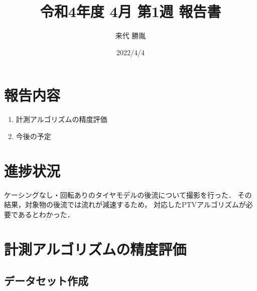 \documentclass[a4j]{jsarticle}
\author{来代 勝胤}
\title{令和4年度 4月 第1週 報告書}
\date{2022/4/4}
\begin{document}
\maketitle

\section*{報告内容}
\begin{enumerate}[1.]
  \item 計測アルゴリズムの精度評価
  \item 今後の予定
\end{enumerate}

\section*{進捗状況}
ケーシングなし・回転ありのタイヤモデルの後流について撮影を行った．
その結果，対象物の後流では流れが減速するため，
対応したPTVアルゴリズムが必要であるとわかった．

\section{計測アルゴリズムの精度評価}
\subsection{データセット作成}
\end{document}
